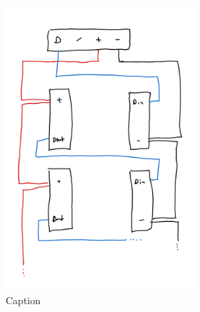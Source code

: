         \begin{figure}[H]
            \begin{center}
                \includegraphics[width=7cm]{media/03_technical_implementation/leds_1.png}
            \end{center}
            \caption{Caption}
            \label{fig:leds_1}
        \end{figure}

